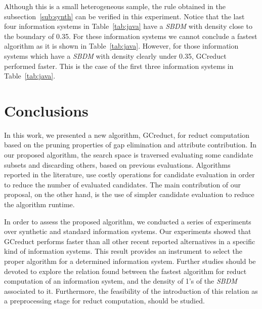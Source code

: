 \documentclass[authoryear,preprint,review,12pt]{elsarticle}
\begin{document}
    Although this is a small heterogeneous sample, the rule obtained in the subsection~\ref{sub:synth} can be verified in this experiment. Notice that the last four information systems in Table~\ref{tab:java} have a \textit{SBDM} with density close to the boundary of 0.35. For these information systems we cannot conclude a fastest algorithm as it is shown in Table~\ref{tab:java}. However, for those information systems which have a \textit{SBDM} with density clearly under 0.35, GCreduct performed faster. This is the case of the first three information systems in Table~\ref{tab:java}.


\section{Conclusions}\label{conclusions}
	In this work, we presented a new algorithm, GCreduct, for reduct computation based on the pruning properties of gap elimination and attribute contribution. In our proposed algorithm, the search space is traversed evaluating some candidate subsets and discarding others, based on previous evaluations. Algorithms reported in the literature, use costly operations for candidate evaluation in order to reduce the number of evaluated candidates. The main contribution of our proposal, on the other hand, is the use of simpler candidate evaluation to reduce the algorithm runtime. 
	
	In order to assess the proposed algorithm, we conducted a series of experiments over synthetic and standard information systems. Our experiments showed that GCreduct performs faster than all other recent reported alternatives in a specific kind of information systems. This result provides an instrument to select the proper algorithm for a determined information system. Further studies should be devoted to explore the relation found between the fastest algorithm for reduct computation of an information system, and the density of 1's of the \textit{SBDM} associated to it. Furthermore, the feasibility of the introduction of this relation as a preprocessing stage for reduct computation, should be studied.
	
\newpage 
{}

\end{document}
